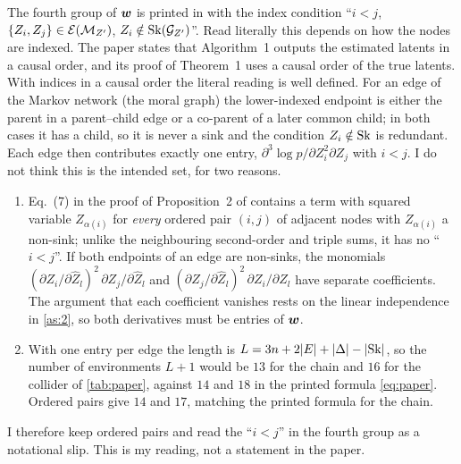 \begin{remark}\label{rem:ij}
The fourth group of $\boldsymbol{w}$ is printed in \cite{ng2025} with the index condition ``$i<j$,
$\{Z_i,Z_j\}\in\mathcal{E}(\mathcal{M}_{Z'})$, $Z_i\notin\mathrm{Sk}(\mathcal{G}_{Z'})$''. Read literally this depends on how the nodes are
indexed. The paper states that Algorithm~1 outputs the estimated latents in a causal order, and its proof
of Theorem~1 uses a causal order of the true latents. With indices in a causal order the literal reading
is well defined. For an edge of the Markov network (the moral graph) the lower-indexed endpoint is either
the parent in a parent--child edge or a co-parent of a later common child; in both cases it has a child,
so it is never a sink and the condition $Z_i\notin\mathrm{Sk}$ is redundant. Each edge then contributes exactly
one entry, $\partial^3\log p/\partial Z_i^2\partial Z_j$ with $i<j$. I do not think this is the intended
set, for two reasons.
\begin{enumerate}[label=(\roman*),leftmargin=2em]
\item Eq.~(7) in the proof of Proposition~2 of \cite{ng2025} contains a term with squared variable
      $Z_{\alpha(i)}$ for \emph{every} ordered pair $(i,j)$ of adjacent nodes with $Z_{\alpha(i)}$ a non-sink;
      unlike the neighbouring second-order and triple sums, it has no ``$i<j$''. If both endpoints of an
      edge are non-sinks, the monomials $(\partial Z_i/\partial\hat Z_l)^2\,\partial Z_j/\partial\hat Z_l$ and
      $(\partial Z_j/\partial\hat Z_l)^2\,\partial Z_i/\partial\hat Z_l$ have separate coefficients. The
      argument that each coefficient vanishes rests on the linear independence in \cref{as:2}, so
      both derivatives must be entries of $\boldsymbol{w}$.
\item With one entry per edge the length is $L=3n+2|E|+|\Delta|-|\mathrm{Sk}|$, so the number of environments
      $L+1$ would be $13$ for the chain and $16$ for the collider of \cref{tab:paper}, against $14$ and $18$
      in the printed formula \cref{eq:paper}. Ordered pairs give $14$ and $17$, matching the printed
      formula for the chain.
\end{enumerate}
I therefore keep ordered pairs and read the ``$i<j$'' in the fourth group as a notational slip. This is my
reading, not a statement in the paper.
\end{remark}